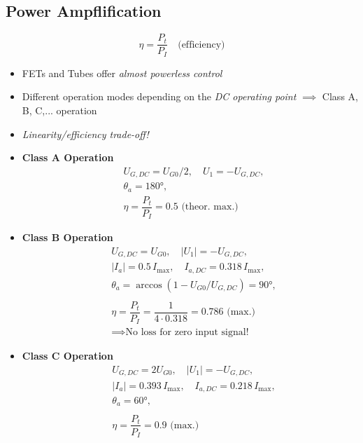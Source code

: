\subsection{Power Ampflification}
\begin{equation*}
    \eta = \dfrac{P_t}{P_I} \quad \text{(efficiency)}
\end{equation*}
\begin{itemize}
    \itemsep0pt
    \item FETs and Tubes offer \textit{almost powerless control}
    \item Different operation modes  depending on the \textit{DC operating point} $\implies$ Class A, B, C,... operation
    \item \textit{Linearity/efficiency trade-off!}
    \item \textbf{Class A Operation}
        \begin{align*}
            &U_{G,DC} = U_{G0}/2, \quad U_1 = -U_{G,DC},\\
            &\theta_a = \ang{180},\\
            &\eta = \dfrac{P_t}{P_I} = 0.5\text{ (theor. max.)}
        \end{align*}
    \item \textbf{Class B Operation}
        \begin{align*}
            &U_{G,DC} = U_{G0}, \quad |U_1| = -U_{G,DC},\\
            &|I_a| = 0.5 \, I_{\mathrm{max}}, \quad I_{a,DC} = 0.318 \, I_{\mathrm{max}},\\
            &\theta_a = \arccos\left(1-U_{G0}/U_{G,DC}\right) = \ang{90},\\\\
            &\eta = \dfrac{P_t}{P_I} = \dfrac{1}{4\cdot0.318} = 0.786\text{ (max.) }\\
            &\implies \text{No loss for zero input signal!}
        \end{align*}
    \item \textbf{Class C Operation}
        \begin{align*}
            &U_{G,DC} = 2 U_{G0}, \quad |U_1| = -U_{G,DC},\\
            &|I_a| = 0.393 \, I_{\mathrm{max}}, \quad I_{a,DC} = 0.218 \, I_{\mathrm{max}},\\
            &\theta_a = \ang{60},\\\\
            &\eta = \dfrac{P_t}{P_I} = 0.9\text{ (max.) }
        \end{align*}
\end{itemize}

